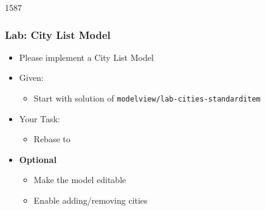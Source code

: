 \begin{slide}{1587}\frametitle{Lab: City List Model}
  \begin{itemize}
  \item Please implement a City List Model
  \item Given:
    \begin{itemize}
    \item Start with solution of \texttt{modelview/lab-cities-standarditem}
    \end{itemize}
  \item Your Task:
    \begin{itemize}
    \item Rebase  to 
    \end{itemize}
  \item \textbf{Optional}
    \begin{itemize}
    \item Make the model editable
    \item Enable adding/removing cities
   \end{itemize}
 \end{itemize}
 
\end{slide}



